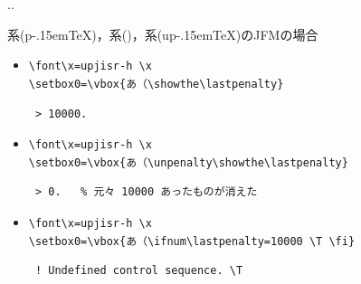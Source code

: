 \documentclass[a5paper,dvipdfmx,14pt]{beamer}
\def\pTeX{p\kern-.15em\TeX}
\def\upTeX{u\pTeX}
\begin{document}
\begin{frame}[t,fragile]{\insertsectionnumber.\insertsubsectionnumber. \insertsubsection}{}
{\footnotesize
{}系(\pTeX)，系()，系(\upTeX)のJFMの場合
\begin{itemize}
  \item \verb+\font\x=upjisr-h \x+\\
        \verb+\setbox0=\vbox{あ（\showthe\lastpenalty}+
\begin{verbnote}
\begin{verbatim}
 > 10000.
\end{verbatim}
\end{verbnote}
\end{itemize}\vskip-20pt
\begin{itemize}
  \item \verb+\font\x=upjisr-h \x+\\
        \verb+\setbox0=\vbox{あ（\unpenalty\showthe\lastpenalty}+
\begin{verbnote}
\begin{verbatim}
 > 0.   % 元々 10000 あったものが消えた
\end{verbatim}
\end{verbnote}
\end{itemize}\vskip-20pt
\begin{itemize}
  \item \verb+\font\x=upjisr-h \x+\\
        \verb+\setbox0=\vbox{あ（\ifnum\lastpenalty=10000 \T \fi}+
\begin{verbnote}
\begin{verbatim}
 ! Undefined control sequence. \T
\end{verbatim}
\end{verbnote}
\end{itemize}\vskip-20pt
}
\end{frame}
\end{document}
